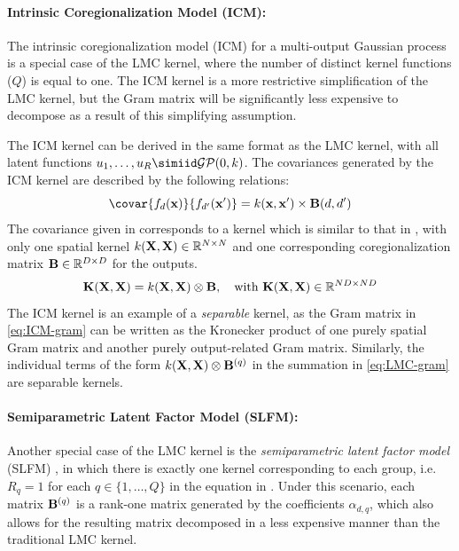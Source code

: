 \documentclass[10pt]{article}
\numberwithin{equation}{section}
\newcommand{\calGP}{\mathcal{GP}}
\begin{document}
\paragraph{Intrinsic Coregionalization Model (ICM):} The intrinsic coregionalization model (ICM) for a multi-output Gaussian process is a special case of the LMC kernel, where the number of distinct kernel functions ($Q$) is equal to one. The ICM kernel is a more restrictive simplification of the LMC kernel, but the Gram matrix will be significantly less expensive to decompose as a result of this simplifying assumption.

The ICM kernel can be derived in the same format as the LMC kernel, with all latent functions $u_{1}, \dots, u_{R} \simiid \calGP(0,k)$. The covariances generated by the ICM kernel are described by the following relations:
\begin{equation}
    \label{eq:ICM-covariance}
    \covar{f_{d}(\bfx)}{f_{d'}(\bfx')} = k(\bfx, \bfx') \times \bfB(d, d')
\end{equation}
The covariance given in  corresponds to a kernel which is similar to that in , with only one spatial kernel $k(\mathbf{X}, \mathbf{X}) \in \mathbb{R}^{N \times N}$ and one corresponding coregionalization matrix $\mathbf{B} \in \mathbb{R}^{D \times D}$ for the outputs. 
\begin{equation}
    \label{eq:ICM-gram}
    \bfK(\bfX, \bfX) = k(\bfX, \bfX) \otimes \bfB, \quad \textrm{with}\ \bfK(\bfX, \bfX) \in \bbR^{ND \times ND}
\end{equation}
The ICM kernel is an example of a \emph{separable} kernel, as the Gram matrix in \ref{eq:ICM-gram} can be written as the Kronecker product of one purely spatial Gram matrix and another purely output-related Gram matrix. Similarly, the individual terms of the form $k(\mathbf{X}, \mathbf{X}) \otimes \mathbf{B}^{(q)}$ in the summation in \ref{eq:LMC-gram} are separable kernels.

\paragraph{Semiparametric Latent Factor Model (SLFM):} Another special case of the LMC kernel is the \emph{semiparametric latent factor model} (SLFM) \citep{Bonilla-Multitask-GP-2007}, in which there is exactly one kernel corresponding to each group, i.e. $R_{q} = 1$ for each $q \in \{1, \dots, Q\}$ in the equation in . Under this scenario, each matrix $\mathbf{B}^{(q)}$ is a rank-one matrix generated by the coefficients ${\alpha}_{d,q}$, which also allows for the resulting matrix decomposed in a less expensive manner than the traditional LMC kernel.
\end{document}
